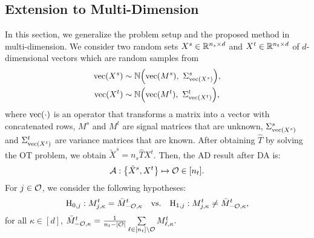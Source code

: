 \subsection{Extension to Multi-Dimension} \label{subsec:extension}
In this section, we generalize the problem setup and the proposed method in multi-dimension. 
%
We consider two random sets $X^s \in \mathbb{R}^{n_s \times d}$ and $X^t \in  \mathbb{R}^{n_t \times d}$ of $d$-dimensional vectors 
%
%
which are random samples from
%
\begin{align*}
	{\rm {vec}} (X^s) &\sim \mathbb{N} \Big ({\rm vec} (M^s), ~ \Sigma^s_{{\rm vec} (X^s)} \Big ), \\
	{\rm {vec}} (X^t) &\sim \mathbb{N} \Big ({\rm vec} (M^t), ~ \Sigma^t_{{\rm vec} (X^t)} \Big ),
\end{align*}
%
where ${\rm vec}(\cdot)$ is an operator that transforms a matrix into a vector with concatenated rows, $M^s$ and $M^t$ are signal matrices that are unknown, $\Sigma^s_{{\rm vec} (X^s)}$ and $\Sigma^t_{{\rm vec} (X^t)}$ are variance matrices that are known. %
%
%
After obtaining $\hat{T}$ by solving the OT problem, %
we obtain 
%
$\tilde{X}^s = n_s \hat{T} X^t$.
%
Then, the AD result after DA is:
%
\begin{align*}
	{\mathcal A}: \big \{ \tilde{X}^s, X^t \big \} 
		\mapsto
		{\mathcal O} \in [n_t].
\end{align*}
%
For $j \in {\mathcal O}$, we consider the following hypotheses:
%
\begin{align*}
	{\rm H}_{0, j}:  M^t_{j, \kappa} = \bar{ M}^t_{- {\mathcal O}, \kappa}
	\quad
	\text{vs.}
	\quad 
	{\rm H}_{1, j}:  M^t_{j, \kappa} \neq \bar{M}^t_{- {\mathcal O}, \kappa},
\end{align*}
%
for all $\kappa \in [d]$, 
%
$
	\bar{M}^t_{- {\mathcal O}, \kappa} = 
	\frac{1}{n_t - |{\mathcal O}|} \sum \limits_{\ell \in [n_t] \setminus {\mathcal O}}
	M^t_{\ell, \kappa}.
$

